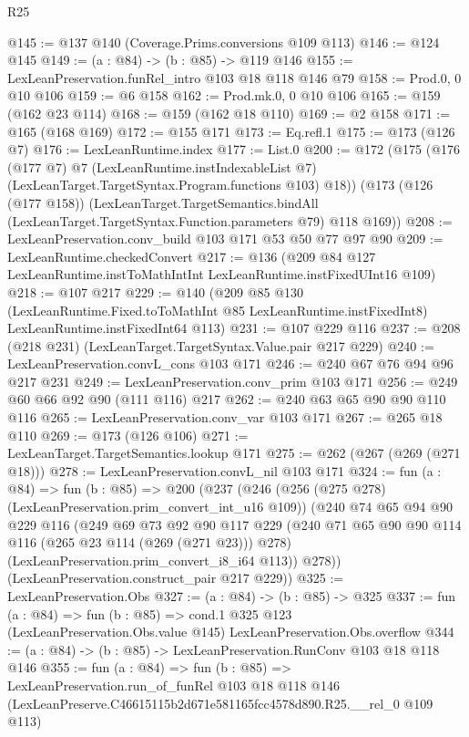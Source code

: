 \begin{lexlean}{R25}
\begin{coremodule}
@145 := @137 @140 (Coverage.Prims.conversions @109 @113)
@146 := @124 @145
@149 := (a : @84) -> (b : @85) -> @119 @146
@155 := LexLeanPreservation.funRel_intro @103 @18 @118 @146 @79
@158 := Prod.{0, 0} @10 @106
@159 := @6 @158
@162 := Prod.mk.{0, 0} @10 @106
@165 := @159 (@162 @23 @114)
@168 := @159 (@162 @18 @110)
@169 := @2 @158
@171 := @165 (@168 @169)
@172 := @155 @171
@173 := Eq.refl.{1}
@175 := @173 (@126 @7)
@176 := LexLeanRuntime.index
@177 := List.{0}
@200 := @172
    (@175
      (@176
        (@177 @7)
        @7
        (LexLeanRuntime.instIndexableList @7)
        (LexLeanTarget.TargetSyntax.Program.functions @103)
        @18))
    (@173
      (@126 (@177 @158))
      (LexLeanTarget.TargetSemantics.bindAll
        (LexLeanTarget.TargetSyntax.Function.parameters @79)
        @118
        @169))
@208 := LexLeanPreservation.conv_build @103 @171 @53 @50 @77 @97 @90
@209 := LexLeanRuntime.checkedConvert
@217 := @136 (@209 @84 @127 LexLeanRuntime.instToMathIntInt LexLeanRuntime.instFixedUInt16 @109)
@218 := @107 @217
@229 := @140
    (@209
      @85
      @130
      (LexLeanRuntime.Fixed.toToMathInt @85 LexLeanRuntime.instFixedInt8)
      LexLeanRuntime.instFixedInt64
      @113)
@231 := @107 @229 @116
@237 := @208 (@218 @231) (LexLeanTarget.TargetSyntax.Value.pair @217 @229)
@240 := LexLeanPreservation.convL_cons @103 @171
@246 := @240 @67 @76 @94 @96 @217 @231
@249 := LexLeanPreservation.conv_prim @103 @171
@256 := @249 @60 @66 @92 @90 (@111 @116) @217
@262 := @240 @63 @65 @90 @90 @110 @116
@265 := LexLeanPreservation.conv_var @103 @171
@267 := @265 @18 @110
@269 := @173 (@126 @106)
@271 := LexLeanTarget.TargetSemantics.lookup @171
@275 := @262 (@267 (@269 (@271 @18)))
@278 := LexLeanPreservation.convL_nil @103 @171
@324 := fun (a : @84) =>
  fun (b : @85) =>
  @200
    (@237
      (@246
        (@256 (@275 @278) (LexLeanPreservation.prim_convert_int_u16 @109))
        (@240
          @74
          @65
          @94
          @90
          @229
          @116
          (@249
            @69
            @73
            @92
            @90
            @117
            @229
            (@240 @71 @65 @90 @90 @114 @116 (@265 @23 @114 (@269 (@271 @23))) @278)
            (LexLeanPreservation.prim_convert_i8_i64 @113))
          @278))
      (LexLeanPreservation.construct_pair @217 @229))
@325 := LexLeanPreservation.Obs
@327 := (a : @84) -> (b : @85) -> @325
@337 := fun (a : @84) =>
  fun (b : @85) =>
  cond.{1} @325 @123 (LexLeanPreservation.Obs.value @145) LexLeanPreservation.Obs.overflow
@344 := (a : @84) -> (b : @85) -> LexLeanPreservation.RunConv @103 @18 @118 @146
@355 := fun (a : @84) =>
  fun (b : @85) =>
  LexLeanPreservation.run_of_funRel
    @103
    @18
    @118
    @146
    (LexLeanPreserve.C46615115b2d671e581165fcc4578d890.R25.__rel_0 @109 @113)
\end{coremodule}
\end{lexlean}
